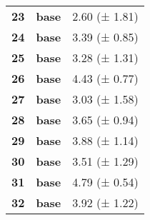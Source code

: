 \begin{longtable}{lll}
\cline{1-3}
\textbf{23} & \textbf{base} & 2.60 (± 1.81) \\
\cline{1-3}
\textbf{24} & \textbf{base} & 3.39 (± 0.85) \\
\cline{1-3}
\textbf{25} & \textbf{base} & 3.28 (± 1.31) \\
\cline{1-3}
\textbf{26} & \textbf{base} & 4.43 (± 0.77) \\
\cline{1-3}
\textbf{27} & \textbf{base} & 3.03 (± 1.58) \\
\cline{1-3}
\textbf{28} & \textbf{base} & 3.65 (± 0.94) \\
\cline{1-3}
\textbf{29} & \textbf{base} & 3.88 (± 1.14) \\
\cline{1-3}
\textbf{30} & \textbf{base} & 3.51 (± 1.29) \\
\cline{1-3}
\textbf{31} & \textbf{base} & 4.79 (± 0.54) \\
\cline{1-3}
\textbf{32} & \textbf{base} & 3.92 (± 1.22) \\
\cline{1-3}
\end{longtable}
